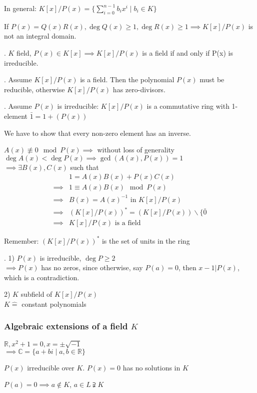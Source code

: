 In general: $K[x] / P(x) = \{ \sum_{i=0}^{n-1} b_i x^i \mid b_i \in K\}$

If $P(x) = Q(x)R(x), \deg Q(x) \geq 1, \deg R(x) \geq 1 \implies K[x] / P(x)$ is not an integral domain.

\Theorem.
$K$ field, $P(x) \in K[x] \implies K[x] / P(x)$ is a field if and only if P(x) is irreducible.

\ProofForward.
Assume $K[x] / P(x)$ is a field. Then the polynomial $P(x)$ must be reducible, otherwise $K[x] / P(x)$ has zero-divisors.

\ProofBackward. Assume $P(x)$ is irreducible:
$K[x] / P(x)$ is a commutative ring with 1-element $\bar{1} = 1+ (P(x))$

We have to show that every non-zero element has an inverse.

$A(x) \not\equiv 0 \mod P(x) \implies $ without loss of generality $\deg A(x) < \deg P(x) \implies \gcd(A(x), P(x)) = 1$\\
$\implies \exists B(x), C(x)$ such that
\begin{align*}
  & 1 = A(x)B(x) + P(x)C(x)\\
  \implies & 1 \equiv A(x) B(x) \mod P(x) \\
  \implies & B(x) = A(x)^{-1} \text{ in } K[x] / P(x) \\
  \implies & (K[x] / P(x))^{*} = (K[x]/P(x)) \backslash \{\bar{0} \\
  \implies & K[x] / P(x) \text{ is a field}
\end{align*}

Remember: $(K[x] / P(x))^{*}$ is the set of units in the ring

\Remark.
1) $P(x)$ is irreducible, $\deg P \geq 2$ \\
$\implies P(x)$ has no zeros, since otherwise, say $P(a) = 0$, then $x -1 | P(x)$, which is a contradiction.

2) $K$ subfield of $K[x]/P(x)$\\
$K\hat{=}$ constant polynomials

\subsubsection{Algebraic extensions of a field $K$}
$\mathbb{R}, x^2 +1 = 0, x = \pm \sqrt{-1}$ \\
$\implies \mathbb{C} = \{a+bi \mid a,b \in \mathbb{R} \}$

$P(x)$ irreducible over $K$. $P(x) = 0$ has no solutions in $K$

$P(a) = 0 \implies a\notin K$, $ a \in L \supsetneqq K$


